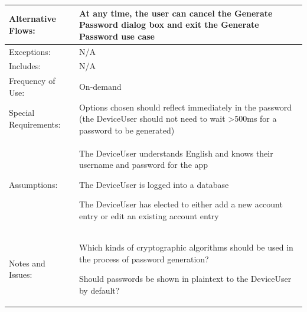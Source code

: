 \documentclass[stu]{apa7}
\newcommand{\nextitem}{\par\hspace*{\labelsep}\textbullet\hspace*{\labelsep}}
\begin{document}
{\begin{xltabular}{\textwidth}{|l|X|}
  Alternative Flows: & \nextitem At any time, the user can cancel the Generate Password dialog box and exit the Generate Password use case \\ \hline

  Exceptions: & N/A \\ \hline

  Includes: & N/A \\ \hline

  Frequency of Use: & On-demand \\ \hline

  Special Requirements: & \nextitem Options chosen should reflect immediately in the password (the DeviceUser should not need to wait >500ms for a password to be generated) \\ \hline

  Assumptions: & \nextitem The DeviceUser understands English and knows their username and password for the app \nextitem The DeviceUser is logged into a database \nextitem The DeviceUser has elected to either add a new account entry or edit an existing account entry \\ \hline

  Notes and Issues: & \nextitem Which kinds of cryptographic algorithms should be used in the process of password generation? \nextitem Should passwords be shown in plaintext to the DeviceUser by default? \\ \hline

\end{xltabular}}

\pagebreak
\end{document}
